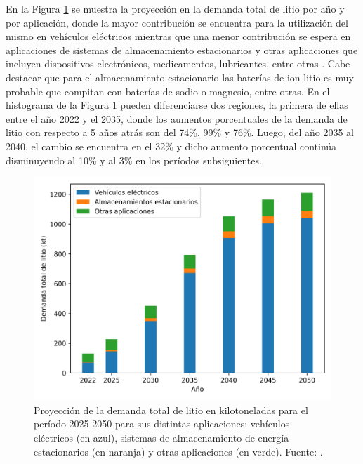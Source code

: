 En la Figura \ref{fig:iea-Li} se muestra la proyección en la demanda total de 
litio por año y por aplicación, donde la mayor contribución se encuentra para la 
utilización del mismo en vehículos eléctricos mientras que una menor contribución 
se espera en aplicaciones de sistemas de almacenamiento estacionarios y otras 
aplicaciones que incluyen dispositivos electrónicos, medicamentos, lubricantes, 
entre otras \cite{IEA}. Cabe destacar que para el almacenamiento estacionario 
las baterías de ion-litio es muy probable que compitan con baterías de sodio o magnesio, entre 
otras. En el histograma de la Figura \ref{fig:iea-Li} pueden diferenciarse dos 
regiones, la primera de ellas entre el año 2022 y el 2035, donde los aumentos
porcentuales de la demanda de litio con respecto a 5 años atrás son del 74\%, 
99\% y 76\%. Luego, del año 2035 al 2040, el cambio se encuentra en el 32\% y
dicho aumento porcentual continúa disminuyendo al 10\% y al 3\% en los períodos 
subsiguientes.
\begin{figure}[h!]
    \centering
    \includegraphics[width=.8\textwidth]{Introduccion/energia/iea-Li.png}
    \caption{Proyección de la demanda total de litio en kilotoneladas para el 
    período 2025-2050 para sus distintas aplicaciones: vehículos eléctricos (en 
    azul), sistemas de almacenamiento de energía estacionarios (en naranja) y
    otras aplicaciones (en verde). Fuente: \cite{IEA}.}
    \label{fig:iea-Li}
\end{figure}
